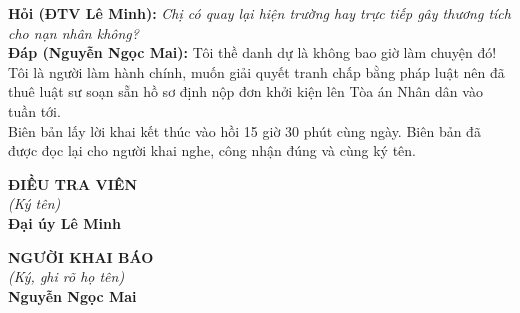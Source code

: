 \documentclass[12pt,a4paper]{article}
\begin{document}
\noindent\textbf{Hỏi (ĐTV Lê Minh):} \textit{Chị có quay lại hiện trường hay trực tiếp gây thương tích cho nạn nhân không?}\\[0.15cm]
\noindent\textbf{Đáp (Nguyễn Ngọc Mai):} Tôi thề danh dự là không bao giờ làm chuyện đó! Tôi là người làm hành chính, muốn giải quyết tranh chấp bằng pháp luật nên đã thuê luật sư soạn sẵn hồ sơ định nộp đơn khởi kiện lên Tòa án Nhân dân vào tuần tới.\\[0.35cm]


Biên bản lấy lời khai kết thúc vào hồi 15 giờ 30 phút cùng ngày. Biên bản đã được đọc lại cho người khai nghe, công nhận đúng và cùng ký tên.

\vspace{0.8cm}
\noindent
\begin{minipage}[t]{0.48\textwidth}
    \begin{center}
        \textbf{ĐIỀU TRA VIÊN}\\[0.1cm]
        \textit{(Ký tên)}\\[1.6cm]
        \textbf{Đại úy Lê Minh}
    \end{center}
\end{minipage}
\hfill
\begin{minipage}[t]{0.48\textwidth}
    \begin{center}
        \textbf{NGƯỜI KHAI BÁO}\\[0.1cm]
        \textit{(Ký, ghi rõ họ tên)}\\[1.6cm]
        \textbf{Nguyễn Ngọc Mai}
    \end{center}
\end{minipage}
\end{document}
